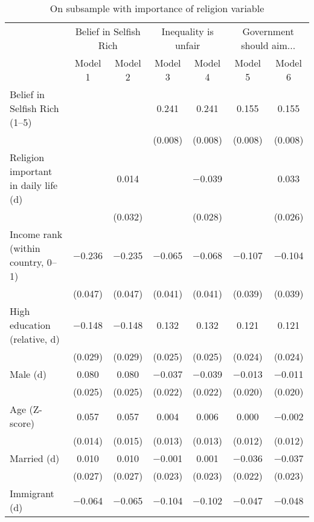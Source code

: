 \begin{table}

\caption{\label{tab:unnamed-chunk-72}On subsample with importance of religion variable}
\centering
\begin{tabular}[t]{lcccccc}
\toprule
\multicolumn{1}{c}{ } & \multicolumn{2}{c}{Belief in Selfish Rich} & \multicolumn{2}{c}{Inequality is unfair} & \multicolumn{2}{c}{Government should aim...} \\
\cmidrule(l{3pt}r{3pt}){2-3} \cmidrule(l{3pt}r{3pt}){4-5} \cmidrule(l{3pt}r{3pt}){6-7}
  & Model 1 & Model 2 & Model 3 & Model 4 & Model 5 & Model 6\\
\midrule
Belief in Selfish Rich (1--5) &  &  & \num{0.241} & \num{0.241} & \num{0.155} & \num{0.155}\\
 &  &  & (\num{0.008}) & (\num{0.008}) & (\num{0.008}) & (\num{0.008})\\
Religion important in daily life (d) &  & \num{0.014} &  & \num{-0.039} &  & \num{0.033}\\
 &  & (\num{0.032}) &  & (\num{0.028}) &  & (\num{0.026})\\
Income rank (within country, 0--1) & \num{-0.236} & \num{-0.235} & \num{-0.065} & \num{-0.068} & \num{-0.107} & \num{-0.104}\\
 & (\num{0.047}) & (\num{0.047}) & (\num{0.041}) & (\num{0.041}) & (\num{0.039}) & (\num{0.039})\\
High education (relative, d) & \num{-0.148} & \num{-0.148} & \num{0.132} & \num{0.132} & \num{0.121} & \num{0.121}\\
 & (\num{0.029}) & (\num{0.029}) & (\num{0.025}) & (\num{0.025}) & (\num{0.024}) & (\num{0.024})\\
Male (d) & \num{0.080} & \num{0.080} & \num{-0.037} & \num{-0.039} & \num{-0.013} & \num{-0.011}\\
 & (\num{0.025}) & (\num{0.025}) & (\num{0.022}) & (\num{0.022}) & (\num{0.020}) & (\num{0.020})\\
Age (Z-score) & \num{0.057} & \num{0.057} & \num{0.004} & \num{0.006} & \num{0.000} & \num{-0.002}\\
 & (\num{0.014}) & (\num{0.015}) & (\num{0.013}) & (\num{0.013}) & (\num{0.012}) & (\num{0.012})\\
Married (d) & \num{0.010} & \num{0.010} & \num{-0.001} & \num{0.001} & \num{-0.036} & \num{-0.037}\\
 & (\num{0.027}) & (\num{0.027}) & (\num{0.023}) & (\num{0.023}) & (\num{0.022}) & (\num{0.023})\\
Immigrant (d) & \num{-0.064} & \num{-0.065} & \num{-0.104} & \num{-0.102} & \num{-0.047} & \num{-0.048}\\

\end{tabular}
\end{table}

